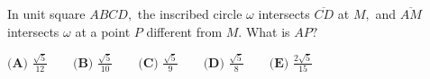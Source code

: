 In unit square $ABCD,$ the inscribed circle $\omega$ intersects $\overline{CD}$ at $M,$ and $\overline{AM}$ intersects $\omega$ at a point $P$ different from $M.$ What is $AP?$

$\textbf{(A) } \frac{\sqrt5}{12} \qquad \textbf{(B) } \frac{\sqrt5}{10} \qquad \textbf{(C) } \frac{\sqrt5}{9} \qquad \textbf{(D) } \frac{\sqrt5}{8} \qquad \textbf{(E) } \frac{2\sqrt5}{15}$